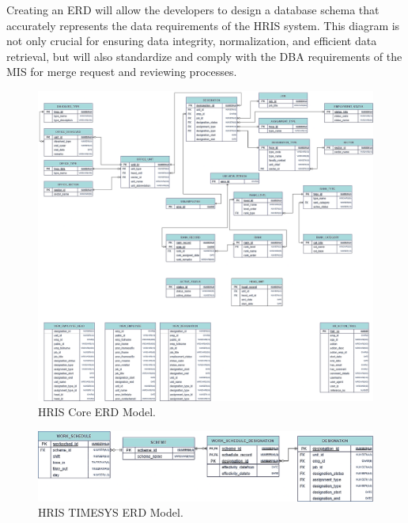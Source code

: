     Creating an ERD will allow the developers to design a database schema that accurately represents the data requirements of the HRIS system. This diagram is not only crucial for ensuring data integrity, normalization, and efficient data retrieval, but will also standardize and comply with the DBA requirements of the MIS for merge request and reviewing processes.

    \begin{figure}[H]
        \centering
        \includegraphics[width=1\linewidth]{figures/images/erd-hris.png}
        \caption{HRIS Core ERD Model.}
        \label{fig:erd-hris}
    \end{figure}

    \begin{figure}[H]
        \centering
        \includegraphics[width=1\linewidth]{figures/images/erd-timesys.png}
        \caption{HRIS TIMESYS ERD Model.}
        \label{fig:erd-timesys}
    \end{figure}

